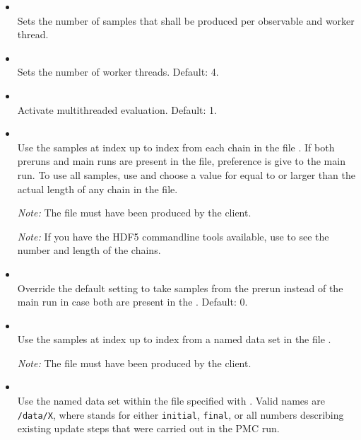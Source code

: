 \begin{itemize}
    \item[] \\[\medskipamount]
        Sets the number of samples that shall be produced per observable and
        worker thread.

    \item[] \\[\medskipamount]
        Sets the number of worker threads. Default: 4.

    \item[] \\[\medskipamount]
        Activate multithreaded evaluation. Default: 1.

    \item[] \\[\medskipamount]
        Use the samples at index  up to index  from
        each chain in the file . If both preruns and main runs are
        present in the file, preference is give to the main run. To use all
        samples, use  and choose a value for  equal to or
        larger than the actual length of any chain in the file.

        \emph{Note:} The file must have been produced by the
         client.

        \emph{Note:} If you have the HDF5 commandline tools available, use
         to see the number and length of the chains.

    \item[] \\[\medskipamount]
        Override the default setting to take samples from the prerun instead of
        the main run in case both are present in the . Default: 0.

    \item[] \\[\medskipamount]
        Use the samples at index  up to index  from
        a named data set in the file .

        \emph{Note:} The file must have been produced by the
         client.

    \item[] \\[\medskipamount]
        Use the named data set within the file specified with .
        Valid names are \texttt{/data/X}, where  stands for either
        \texttt{initial}, \texttt{final}, or all numbers describing existing
        update steps that were carried out in the PMC run.


\end{itemize}
